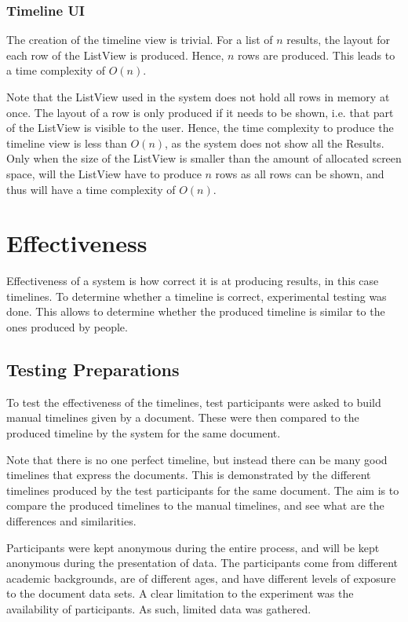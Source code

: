 \subsubsection{Timeline UI}
\par The creation of the timeline view is trivial. For a list of $n$ results, the layout for each row of the ListView is produced. Hence, $n$ rows are produced. This leads to a time complexity of $O(n)$.

\par Note that the ListView used in the system does not hold all rows in memory at once. The layout of a row is only produced if it needs to be shown, i.e. that part of the ListView is visible to the user. Hence, the time complexity to produce the timeline view is less than $O(n)$, as the system does not show all the Results. Only when the size of the ListView is smaller than the amount of allocated screen space, will the ListView have to produce $n$ rows as all rows can be shown, and thus will have a time complexity of $O(n)$.

\section{Effectiveness}

\par Effectiveness of a system is how correct it is at producing results, in this case timelines. To determine whether a timeline is correct, experimental testing was done. This allows to determine whether the produced timeline is similar to the ones produced by people.

\subsection{Testing Preparations}
\par To test the effectiveness of the timelines, test participants were asked to build manual timelines given by a document. These were then compared to the produced timeline by the system for the same document.

\par Note that there is no one perfect timeline, but instead there can be many good timelines that express the documents. This is demonstrated by the different timelines produced by the test participants for the same document.  The aim is to compare the produced timelines to the manual timelines, and see what are the differences and similarities.

\par Participants were kept anonymous during the entire process, and will be kept anonymous during the presentation of data. The participants come from different academic backgrounds, are of different ages, and have different levels of exposure to the document data sets. A clear limitation to the experiment was the availability of participants. As such, limited data was gathered.
 

